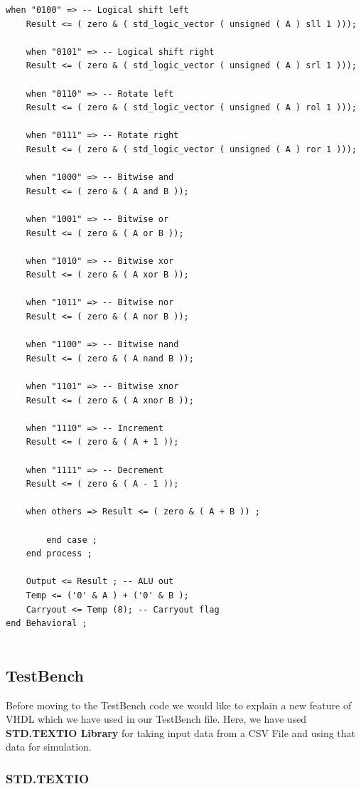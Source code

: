 \documentclass[12pt,singleside,a4paper]{article}
\begin{document}
  \begin{lstlisting}[style=VHDL, frame=single,linewidth = 18cm]
	when "0100" => -- Logical shift left
	Result <= ( zero & ( std_logic_vector ( unsigned ( A ) sll 1 )));

	when "0101" => -- Logical shift right
	Result <= ( zero & ( std_logic_vector ( unsigned ( A ) srl 1 )));

	when "0110" => -- Rotate left
	Result <= ( zero & ( std_logic_vector ( unsigned ( A ) rol 1 )));

	when "0111" => -- Rotate right
	Result <= ( zero & ( std_logic_vector ( unsigned ( A ) ror 1 )));

	when "1000" => -- Bitwise and
	Result <= ( zero & ( A and B ));

	when "1001" => -- Bitwise or
	Result <= ( zero & ( A or B ));

	when "1010" => -- Bitwise xor
	Result <= ( zero & ( A xor B ));

	when "1011" => -- Bitwise nor
	Result <= ( zero & ( A nor B ));

	when "1100" => -- Bitwise nand
	Result <= ( zero & ( A nand B ));

	when "1101" => -- Bitwise xnor
	Result <= ( zero & ( A xnor B ));

	when "1110" => -- Increment
	Result <= ( zero & ( A + 1 ));

	when "1111" => -- Decrement
	Result <= ( zero & ( A - 1 ));

	when others => Result <= ( zero & ( A + B )) ;

		end case ;
	end process ;

	Output <= Result ; -- ALU out
	Temp <= ('0' & A ) + ('0' & B );
	Carryout <= Temp (8); -- Carryout flag
end Behavioral ;


\end{lstlisting}

\newpage
\subsection{TestBench}
Before moving to the TestBench code we would like to explain a new feature of VHDL which we have used in our TestBench file. Here, we have used \textbf{STD.TEXTIO Library} for taking input data from a CSV File and using that data for simulation.

\subsubsection*{STD.TEXTIO}
\end{document}
